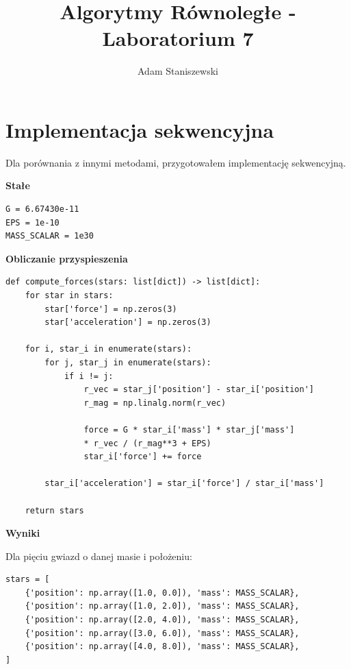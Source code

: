 \documentclass{article}
\title{Algorytmy Równoległe - Laboratorium 7}
\author{Adam Staniszewski}
\begin{document}
\setlength{\parindent}{0pt}

\maketitle

\section{Implementacja sekwencyjna}
Dla porównania z innymi metodami, przygotowałem implementację sekwencyjną.

\vspace{1em}
\textbf{Stałe}
\begin{lstlisting}
G = 6.67430e-11  
EPS = 1e-10  
MASS_SCALAR = 1e30 
\end{lstlisting}

\vspace{1em}
\textbf{Obliczanie przyspieszenia}

\begin{lstlisting}
def compute_forces(stars: list[dict]) -> list[dict]:
    for star in stars:
        star['force'] = np.zeros(3)  
        star['acceleration'] = np.zeros(3)  

    for i, star_i in enumerate(stars):
        for j, star_j in enumerate(stars):
            if i != j: 
                r_vec = star_j['position'] - star_i['position']
                r_mag = np.linalg.norm(r_vec)
                
                force = G * star_i['mass'] * star_j['mass'] 
                * r_vec / (r_mag**3 + EPS)
                star_i['force'] += force

        star_i['acceleration'] = star_i['force'] / star_i['mass']

    return stars
\end{lstlisting}

\vspace{2em}
\textbf{Wyniki}

Dla pięciu gwiazd o danej masie i położeniu:
\begin{lstlisting}
stars = [
    {'position': np.array([1.0, 0.0]), 'mass': MASS_SCALAR},
    {'position': np.array([1.0, 2.0]), 'mass': MASS_SCALAR},
    {'position': np.array([2.0, 4.0]), 'mass': MASS_SCALAR},
    {'position': np.array([3.0, 6.0]), 'mass': MASS_SCALAR},
    {'position': np.array([4.0, 8.0]), 'mass': MASS_SCALAR},
]
\end{lstlisting}
\end{document}
